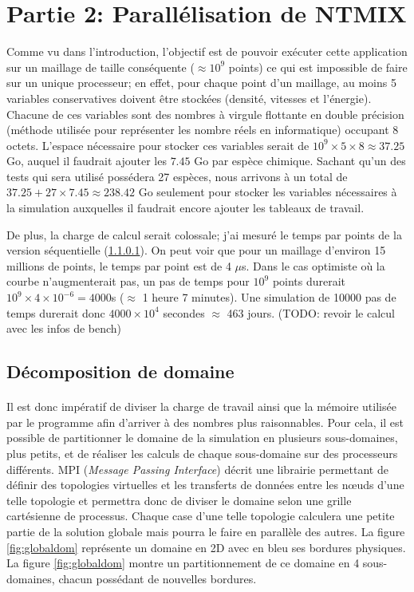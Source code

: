 \section{Partie 2: Parallélisation de NTMIX}


Comme vu dans l'introduction, l'objectif est de pouvoir exécuter cette application sur un maillage de taille conséquente ($\approx 10^9$ points) ce qui est impossible de faire sur un unique processeur; en effet, pour chaque point d'un maillage, au moins 5 variables conservatives doivent être stockées (densité, vitesses et l'énergie). Chacune de ces variables sont des nombres à virgule flottante en double précision (méthode utilisée pour représenter les nombre réels en informatique) occupant 8 octets. L'espace nécessaire pour stocker ces variables serait de $10^9 \times 5 \times 8 \approx 37.25$ Go, auquel il faudrait ajouter les $7.45$ Go par espèce chimique. Sachant qu'un des tests qui sera utilisé possédera 27 espèces, nous arrivons à un total de $37.25+27 \times 7.45\approx 238.42$ Go seulement pour stocker les variables nécessaires à la simulation auxquelles il faudrait encore ajouter les tableaux de travail.





De plus, la charge de calcul serait colossale; j'ai mesuré le temps par points de la version séquentielle (\ref{}). On peut voir que pour un maillage d'environ 15 millions de points, le temps par point est de 4 $\mu$s. Dans le cas optimiste où la courbe n'augmenterait pas, un pas de temps pour $10^9$ points durerait $10^9\times4\times10^{-6}=4000$s ($\approx$ 1 heure 7 minutes). Une simulation de 10000 pas de temps durerait donc $4000\times10^4$ secondes $\approx$ 463 jours. (TODO: revoir le calcul avec les infos de bench)

\subsection{Décomposition de domaine}
\paragraph{}Il est donc impératif de diviser la charge de travail ainsi que la mémoire utilisée par le programme afin d'arriver à des nombres plus raisonnables. 
Pour cela, il est possible de partitionner le domaine de la simulation en plusieurs sous-domaines, plus petits, et de réaliser les calculs de chaque sous-domaine sur des processeurs différents. MPI (\textit{Message Passing Interface}) décrit une librairie permettant de définir des topologies virtuelles et les transferts de données entre les nœuds d'une telle topologie et permettra donc de diviser le domaine selon une grille cartésienne de processus. Chaque case d'une telle topologie calculera une petite partie de la solution globale mais pourra le faire en parallèle des autres. La figure \ref{fig:globaldom} représente un domaine en 2D avec en bleu ses bordures physiques. La figure \ref{fig:globaldom} montre un partitionnement de ce domaine en 4 sous-domaines, chacun possédant de nouvelles bordures.

